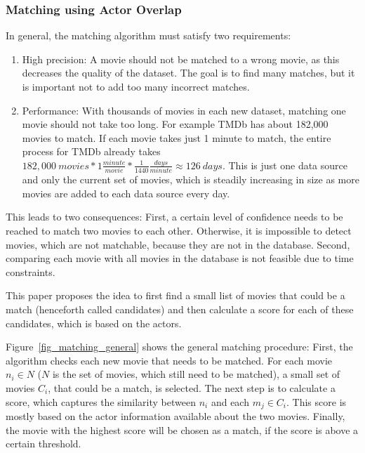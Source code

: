 \subsubsection{Matching using Actor Overlap}
In general, the matching algorithm must satisfy two requirements:
\begin{enumerate}
	\item{High precision:} A movie should not be matched to a wrong movie, as this decreases the quality of the dataset.
	The goal is to find many matches, but it is important not to add too many incorrect matches.
	\item{Performance:} With thousands of movies in each new dataset, matching one movie should not take too long.
	For example TMDb has about 182,000 movies to match.
	If each movie takes just 1 minute to match, the entire process for TMDb already takes $182,000~movies * 1 \frac{minute}{movie} * \frac{1}{1440} \frac{days}{minute} \approx 126~days$.
	This is just one data source and only the current set of movies, which is steadily increasing in size as more movies are added to each data source every day.
\end{enumerate}

This leads to two consequences: First, a certain level of confidence needs to be reached to match two movies to each other.
Otherwise, it is impossible to detect movies, which are not matchable, because they are not in the database.
Second, comparing each movie with all movies in the database is not feasible due to time constraints.

This paper proposes the idea to first find a small list of movies that could be a match (henceforth called candidates) and then calculate a score for each of these candidates, which is based on the actors.

Figure~\ref{fig_matching_general} shows the general matching procedure:
First, the algorithm checks each new movie that needs to be matched.
For each movie $n_i \in N$ ($N$ is the set of movies, which still need to be matched), a small set of movies $C_{i}$, that could be a match, is selected.
The next step is to calculate a score, which captures the similarity between $n_i$ and each $m_j \in C_i$.
This score is mostly based on the actor information available about the two movies.
Finally, the movie with the highest score will be chosen as a match, if the score is above a certain threshold.

